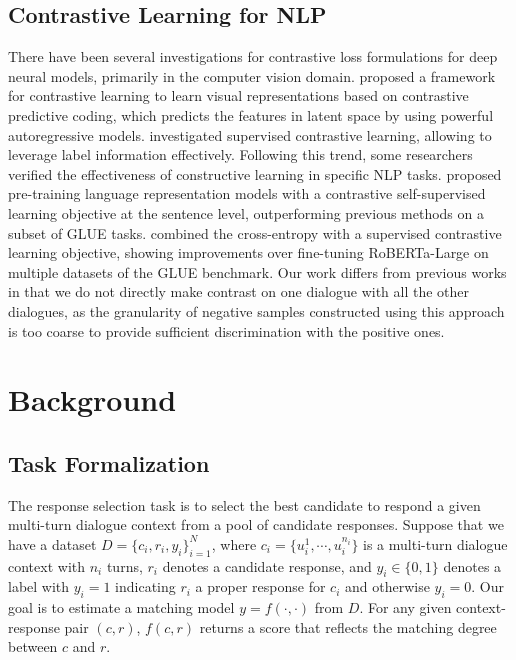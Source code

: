 \documentclass[letterpaper]{article} \usepackage{aaai22}  \usepackage{times}  \usepackage{helvet}  \usepackage{courier}  \usepackage[hyphens]{url}  \usepackage{graphicx} \urlstyle{rm} \def\UrlFont{\rm}  \usepackage{natbib}  \usepackage{caption} \DeclareCaptionStyle{ruled}{labelfont=normalfont,labelsep=colon,strut=off} \frenchspacing  \setlength{\pdfpagewidth}{8.5in}  \setlength{\pdfpageheight}{11in}  \usepackage{algorithm}
\begin{document}
\subsection{Contrastive Learning for NLP}
There have been several investigations for contrastive loss formulations for deep neural models, primarily in the computer vision domain. \citet{oord2018representation} proposed a framework for contrastive learning to learn visual representations based on contrastive predictive coding, which predicts the features in latent space by using powerful autoregressive models. \citet{khosla2020supervised} investigated supervised contrastive learning, allowing to leverage label information effectively. Following this trend, some researchers verified the effectiveness of constructive learning in specific NLP tasks. \citet{fang2020cert} proposed pre-training language representation models with a contrastive self-supervised learning objective at the sentence level, outperforming previous methods on a subset of GLUE tasks. \citet{gunel2020supervised} combined the cross-entropy with a supervised contrastive learning objective, showing improvements over fine-tuning RoBERTa-Large on multiple datasets of the GLUE benchmark. Our work differs from previous works in that we do not directly make contrast on one dialogue with all the other dialogues, as the granularity of negative samples constructed using this approach is too coarse to provide sufficient discrimination with the positive ones.
 \section{Background}

\subsection{Task Formalization}

The response selection task is to select the best candidate to respond a given multi-turn dialogue context from a pool of candidate responses. Suppose that we have a dataset $D=\{c_i,r_i,y_i\}_{i=1}^{N}$, where $c_i=\{u_i^1,\cdots,u_i^{n_i}\}$ is a multi-turn dialogue context with $n_i$ turns, $r_i$ denotes a candidate response, and $y_i\in \{0,1\}$ denotes a label with $y_i=1$ indicating $r_i$ a proper response for $c_i$ and otherwise $y_i=0$. Our goal is to estimate a matching model $y=f(\cdot,\cdot)$ from $D$. For any given context-response pair $(c,r)$, $f(c,r)$ returns a score that reflects the matching degree between $c$ and $r$.
\end{document}
